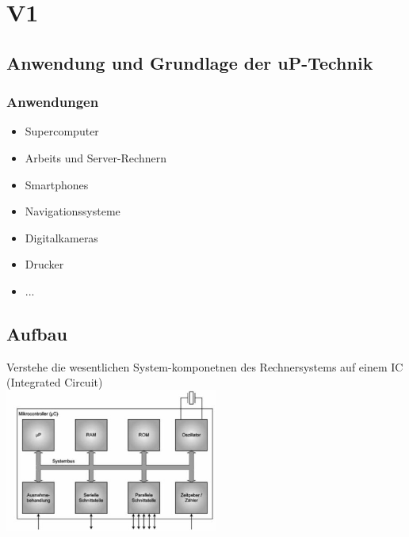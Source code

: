 \section{V1}
\subsection{Anwendung und Grundlage der uP-Technik}
\begin{multicols}{2}
\subsubsection{Anwendungen}
\begin{minipage}{6cm}
\begin{itemize}
    \item Supercomputer
    \item Arbeits und Server-Rechnern
    \item Smartphones
    \item Navigationssysteme
    \item Digitalkameras
    \item Drucker
    \item ...
\end{itemize}
\end{minipage}

\subsection{Aufbau}

Verstehe die wesentlichen System-komponetnen des Rechnersystems auf einem IC (Integrated Circuit)\\	
\includegraphics[width=7cm]{images/aufbauuC}

\end{multicols}
